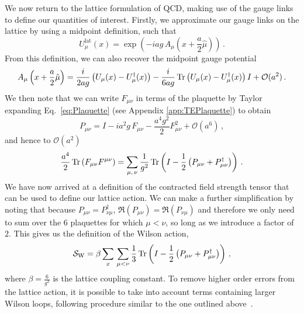 We now return to the lattice formulation of QCD, making use of the gauge links to define our quantities of interest. Firstly, we approximate our gauge links on the lattice by using a midpoint definition, such that
\begin{equation}
U_\mu^\text{lat}(x) = \exp\left(-iag\, A_\mu\left(x+\frac{a}{2}\hat{\mu}\right)\right)\, .
\label{eq:GaugeLinkLat}
\end{equation}
From this definition, we can also recover the midpoint gauge potential~\cite{Leinweber:1998im,Alles:1996ka}
\begin{equation}
A_\mu\left(x+\frac{a}{2}\hat{\mu}\right) = \frac{i}{2ag}\left(U_\mu(x) - U_\mu^\dag(x)\right) - \frac{i}{6ag}\operatorname{Tr}\left(U_\mu(x) - U_\mu^\dag(x)\right)I + \mathcal{O}(a^2)\, .
\label{eq:GaugePotentialLat}
\end{equation}
We then note that we can write $F_{\mu\nu}$ in terms of the plaquette by Taylor expanding Eq.~\eqref{eq:Plaquette} (see Appendix \ref{app:TEPlaquette}) to obtain~\cite{Gupta:1997nd}
%
\begin{equation}
P_{\mu\nu} = I-ia^2g\, F_{\mu\nu} - \frac{a^4 g^2}{2}F^2_{\mu\nu} +\mathcal{O}(a^6)\, ,
\label{eq:PlaquetteExpansion}
\end{equation} 
%
and hence to $\mathcal{O}(a^2)$
%
\begin{align}
\frac{a^4}{2}\operatorname{Tr}\left(F_{\mu\nu}F^{\mu\nu}\right) = \sum_{\mu,\,\nu}\frac{1}{g^2}\operatorname{Tr}\left(I-\frac{1}{2}\left(P_{\mu\nu}+P_{\mu\nu}^\dag\right)\right)\, .
\label{eq:FieldStrengthPlaquette}
\end{align}
%
We have now arrived at a definition of the contracted field strength tensor that can be used to define our lattice action. We can make a further simplification by noting that because $P_{\mu\nu}=P_{\nu\mu}^\dagger$, $\Re(P_{\mu\nu}) = \Re(P_{\nu\mu})$ and therefore we only need to sum over the 6 plaquettes for which $\mu<\nu$, so long as we introduce a factor of $2$. This gives us the definition of the Wilson action, 
%
\begin{equation}
\mathcal{S}_\text{W} = \beta\sum_x\,\sum_{\mu<\nu} \frac{1}{3}\operatorname{Tr}\left(I-\frac{1}{2}\left(P_{\mu\nu}+P_{\mu\nu}^\dag\right)\right)\, ,
\label{eq:WilsonAction}
\end{equation}
%
where $\beta = \frac{6}{g^2}$ is the lattice coupling constant. To remove higher order errors from the lattice action, it is possible to take into account terms containing larger Wilson loops, following procedure similar to the one outlined above~\cite{Alford:1995hw,Symanzik:1983dc,Symanzik:1983gh}.\\

